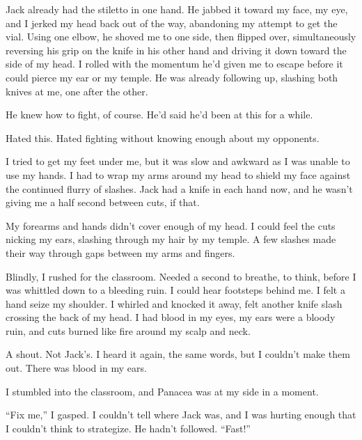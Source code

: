 Jack already had the stiletto in one hand.  He jabbed it toward my face, my eye, and I jerked my head back out of the way, abandoning my attempt to get the vial.  Using one elbow, he shoved me to one side, then flipped over, simultaneously reversing his grip on the knife in his other hand and driving it down toward the side of my head.  I rolled with the momentum he'd given me to escape before it could pierce my ear or my temple.  He was already following up, slashing both knives at me, one after the other.



He knew how to fight, of course.  He'd said he'd been at this for a while.



Hated this.  Hated fighting without knowing enough about my opponents.



I tried to get my feet under me, but it was slow and awkward as I was unable to use my hands.  I had to wrap my arms around my head to shield my face against the continued flurry of slashes. Jack had a knife in each hand now, and he wasn't giving me a half second between cuts, if that.



My forearms and hands didn't cover enough of my head.  I could feel the cuts nicking my ears, slashing through my hair by my temple.  A few slashes made their way through gaps between my arms and fingers.



Blindly, I rushed for the classroom.  Needed a second to breathe, to think, before I was whittled down to a bleeding ruin.  I could hear footsteps behind me.  I felt a hand seize my shoulder.  I whirled and knocked it away, felt another knife slash crossing the back of my head.  I had blood in my eyes, my ears were a bloody ruin, and cuts burned like fire around my scalp and neck.



A shout.  Not Jack's.  I heard it again, the same words, but I couldn't make them out.  There was blood in my ears.



I stumbled into the classroom, and Panacea was at my side in a moment.



``Fix me,'' I gasped.  I couldn't tell where Jack was, and I was hurting enough that I couldn't think to strategize.  He hadn't followed.  ``Fast!''



